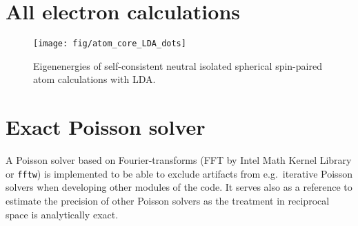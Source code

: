 \documentclass[oribibl]{llncs}
\newcommand{\ttt}[1]{\texttt{#1}}
\begin{document}
\section{All electron calculations} \label{sec:all-electron}
%
\begin{figure}
  \begin{minipage}[c]{.990\textwidth}
	\texttt{[image: fig/atom\_core\_LDA\_dots]} %
  \end{minipage}\hfill
  \begin{minipage}[c]{.009\textwidth}
  \end{minipage}
  \label{fig:atom_core_levels}
  \caption{
	Eigenenergies of self-consistent neutral isolated spherical spin-paired atom calculations with LDA.
  }
\end{figure}
%
%

\section{Exact Poisson solver}
%
%
%
A Poisson solver based on Fourier-transforms (FFT by Intel Math Kernel Library or \ttt{fftw})
is implemented to be able to exclude artifacts from e.g.~iterative Poisson solvers
when developing other modules of the code. 
It serves also as a reference to estimate the precision of other Poisson solvers
as the treatment in reciprocal space is analytically exact.
\end{document}
